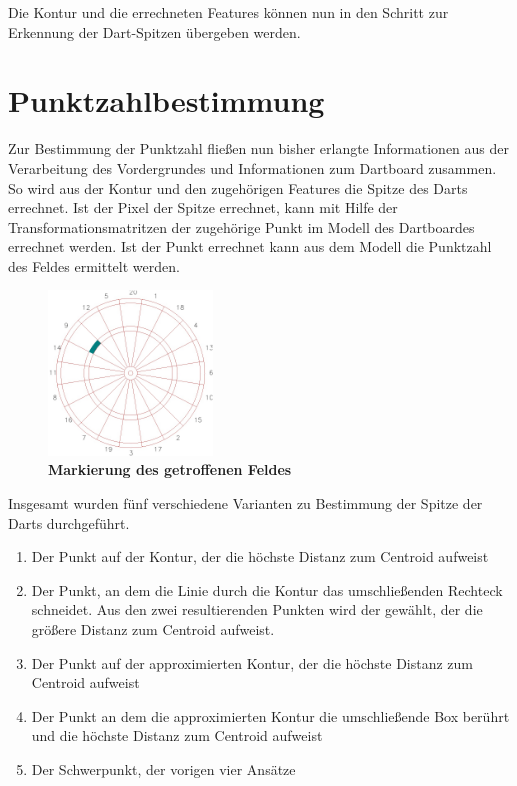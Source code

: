 Die Kontur und die errechneten Features können nun in den Schritt zur Erkennung der Dart-Spitzen übergeben werden.


\section{Punktzahlbestimmung}
\label{sec:score}
Zur Bestimmung der Punktzahl fließen nun bisher erlangte Informationen aus der Verarbeitung des Vordergrundes  und Informationen zum Dartboard  zusammen.
So wird aus der Kontur und den zugehörigen Features die Spitze des Darts errechnet. Ist der Pixel der Spitze errechnet, kann mit Hilfe der Transformationsmatritzen der zugehörige Punkt im Modell des Dartboardes errechnet werden. Ist der Punkt errechnet kann aus dem Modell die Punktzahl des Feldes ermittelt werden. 

\begin{figure}[ht]
\centering
\includegraphics[width=0.39\textwidth]{media/pointimg}
\caption{\textbf{Markierung des getroffenen Feldes}}
\label{Fig:acceptingimg}
\end{figure}

Insgesamt wurden fünf verschiedene Varianten zu Bestimmung der Spitze der Darts durchgeführt. 
\begin{enumerate}
	\item Der Punkt auf der Kontur, der die höchste Distanz zum Centroid aufweist
	\item Der Punkt, an dem die Linie durch die Kontur das umschließenden Rechteck schneidet. Aus den zwei resultierenden Punkten wird der gewählt, der die größere Distanz zum Centroid aufweist.
	\item Der Punkt auf der approximierten Kontur, der die höchste Distanz zum Centroid  aufweist
	\item Der Punkt an dem die approximierten Kontur die umschließende Box berührt und die höchste Distanz zum Centroid aufweist
	\item Der Schwerpunkt, der vorigen vier Ansätze
\end{enumerate}


